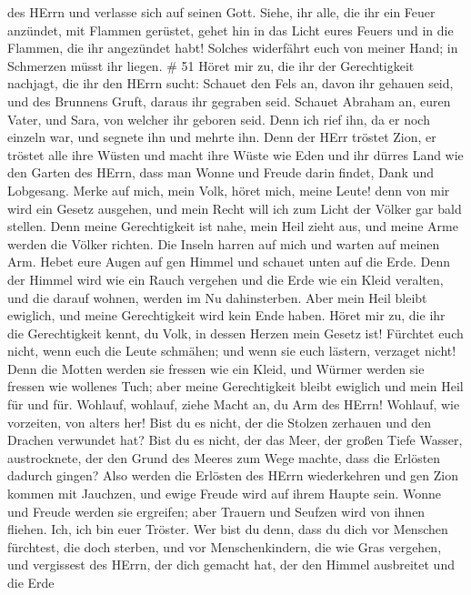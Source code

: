 des HErrn und verlasse sich auf seinen Gott.  Siehe, ihr
alle, die ihr ein Feuer anzündet, mit Flammen gerüstet, gehet hin in das
Licht eures Feuers und in die Flammen, die ihr angezündet habt! Solches
widerfährt euch von meiner Hand; in Schmerzen müsst ihr liegen. \# 51
 Höret mir zu, die ihr der Gerechtigkeit nachjagt, die ihr
den HErrn sucht: Schauet den Fels an, davon ihr gehauen seid, und des
Brunnens Gruft, daraus ihr gegraben seid.  Schauet Abraham
an, euren Vater, und Sara, von welcher ihr geboren seid. Denn ich rief
ihn, da er noch einzeln war, und segnete ihn und mehrte ihn.
 Denn der HErr tröstet Zion, er tröstet alle ihre Wüsten und
macht ihre Wüste wie Eden und ihr dürres Land wie den Garten des HErrn,
dass man Wonne und Freude darin findet, Dank und Lobgesang. 
Merke auf mich, mein Volk, höret mich, meine Leute! denn von mir wird
ein Gesetz ausgehen, und mein Recht will ich zum Licht der Völker gar
bald stellen.  Denn meine Gerechtigkeit ist nahe, mein Heil
zieht aus, und meine Arme werden die Völker richten. Die Inseln harren
auf mich und warten auf meinen Arm.  Hebet eure Augen auf
gen Himmel und schauet unten auf die Erde. Denn der Himmel wird wie ein
Rauch vergehen und die Erde wie ein Kleid veralten, und die darauf
wohnen, werden im Nu dahinsterben. Aber mein Heil bleibt ewiglich, und
meine Gerechtigkeit wird kein Ende haben.  Höret mir zu, die
ihr die Gerechtigkeit kennt, du Volk, in dessen Herzen mein Gesetz ist!
Fürchtet euch nicht, wenn euch die Leute schmähen; und wenn sie euch
lästern, verzaget nicht!  Denn die Motten werden sie fressen
wie ein Kleid, und Würmer werden sie fressen wie wollenes Tuch; aber
meine Gerechtigkeit bleibt ewiglich und mein Heil für und für.
 Wohlauf, wohlauf, ziehe Macht an, du Arm des HErrn!
Wohlauf, wie vorzeiten, von alters her! Bist du es nicht, der die
Stolzen zerhauen und den Drachen verwundet hat?  Bist du es
nicht, der das Meer, der großen Tiefe Wasser, austrocknete, der den
Grund des Meeres zum Wege machte, dass die Erlösten dadurch gingen?
 Also werden die Erlösten des HErrn wiederkehren und gen
Zion kommen mit Jauchzen, und ewige Freude wird auf ihrem Haupte sein.
Wonne und Freude werden sie ergreifen; aber Trauern und Seufzen wird von
ihnen fliehen.  Ich, ich bin euer Tröster. Wer bist du
denn, dass du dich vor Menschen fürchtest, die doch sterben, und vor
Menschenkindern, die wie Gras vergehen,  und vergissest des
HErrn, der dich gemacht hat, der den Himmel ausbreitet und die Erde
